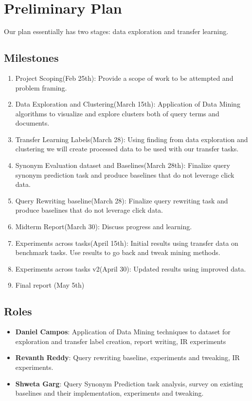 \section{Preliminary Plan}
Our plan essentially has two stages: data exploration and transfer learning. 
\subsection{Milestones}
\begin{enumerate}
    \item Project Scoping(Feb 25th): Provide a scope of work to be attempted and problem framing.
    \item Data Exploration and Clustering(March 15th): Application of Data Mining algorithms to visualize and explore clusters both of query terms and documents.
    \item Transfer Learning Labels(March 28): Using finding from data exploration and clustering we will create processed data to be used with our transfer tasks.
    \item Synonym Evaluation dataset and Baselines(March 28th): Finalize query synonym prediction task and produce baselines that do not leverage click data.
    \item Query Rewriting baseline(March 28): Finalize query rewriting task and produce baselines that do not leverage click data.
    \item Midterm Report(March 30): Discuss progress and learning.
    \item Experiments across tasks(April 15th): Initial results using transfer data on benchmark tasks. Use results to go back and tweak mining methods.
    \item Experiments across tasks v2(April 30): Updated results using improved data.
    \item Final report (May 5th)
\end{enumerate}
\subsection{Roles}
\begin{itemize}
  \item \textbf{Daniel Campos}: Application of Data Mining techniques to dataset for exploration and transfer label creation, report writing, IR experiments
  \item \textbf{Revanth Reddy}: Query rewriting baseline, experiments and tweaking, IR experiments.
  \item \textbf{Shweta Garg}: Query Synonym Prediction task analysis, survey on existing baselines and their implementation, experiments and tweaking. 
\end{itemize}
